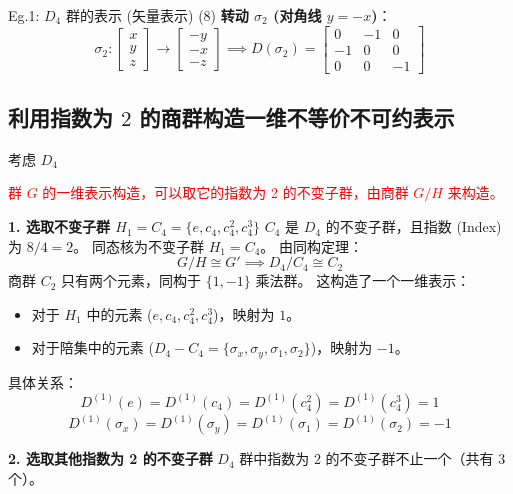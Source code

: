 \begin{example}{Eg.1: $D_4$ 群的表示 (矢量表示)}
    (8) \textbf{转动 $\sigma_2$ (对角线 $y=-x$)}：
    \begin{equation}
        \sigma_2: \begin{bmatrix} x \\ y \\ z \end{bmatrix} \to \begin{bmatrix} -y \\ -x \\ -z \end{bmatrix} \implies D(\sigma_2) = \begin{bmatrix} 0 & -1 & 0 \\ -1 & 0 & 0 \\ 0 & 0 & -1 \end{bmatrix}
    \end{equation}
\end{example}

\subsection{利用指数为 $2$ 的商群构造一维不等价不可约表示}
考虑 $D_4$ 

\textcolor{red}{群 $G$ 的一维表示构造，可以取它的指数为 2 的不变子群，由商群 $G/H$ 来构造。}

\textbf{1. 选取不变子群 $H_1 = C_4 = \{e, c_4, c_4^2, c_4^3\}$}
$C_4$ 是 $D_4$ 的不变子群，且指数 (Index) 为 $8/4 = 2$。
同态核为不变子群 $H_1 = C_4$。
由同构定理：
\begin{equation}
    G/H \cong G' \implies D_4/C_4 \cong C_2
\end{equation}
商群 $C_2$ 只有两个元素，同构于 $\{1, -1\}$ 乘法群。
这构造了一个一维表示：
\begin{itemize}
    \item 对于 $H_1$ 中的元素 ($e, c_4, c_4^2, c_4^3$)，映射为 $1$。
    \item 对于陪集中的元素 ($D_4 - C_4 = \{\sigma_x, \sigma_y, \sigma_1, \sigma_2\}$)，映射为 $-1$。
\end{itemize}
具体关系：
\begin{equation}
    D^{(1)}(e) = D^{(1)}(c_4) = D^{(1)}(c_4^2) = D^{(1)}(c_4^3) = 1
\end{equation}
\begin{equation}
    D^{(1)}(\sigma_x) = D^{(1)}(\sigma_y) = D^{(1)}(\sigma_1) = D^{(1)}(\sigma_2) = -1
\end{equation}

\textbf{2. 选取其他指数为 2 的不变子群}
$D_4$ 群中指数为 2 的不变子群不止一个（共有 3 个）。
%
%

